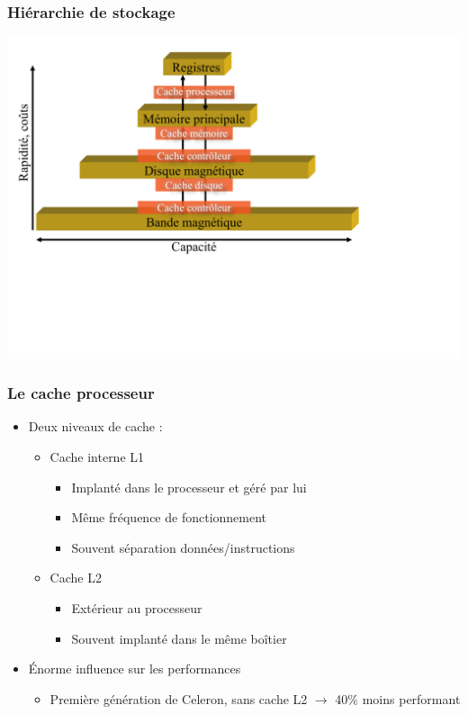 \begin{frame}
\frametitle{Hiérarchie de stockage}
\includegraphics[width=\textwidth]{../illustration/hierarchie_stockage.pdf}
\end{frame}


\begin{frame}
\frametitle{Le cache processeur}
\begin{itemize}
\item Deux niveaux de cache :
\begin{itemize}
\item Cache interne L1
\begin{itemize}
\item Implanté dans le processeur et géré par lui
\item Même fréquence de fonctionnement
\item Souvent séparation données/instructions
\end{itemize}
\item Cache L2 
\begin{itemize}
\item Extérieur au processeur
\item Souvent implanté dans le même boîtier
\end{itemize}
\end{itemize}
\item Énorme influence sur les performances
\begin{itemize}
\item Première génération de Celeron, sans cache L2 $\rightarrow$ 40\% moins performant
\end{itemize}
\end{itemize}
\end{frame}

